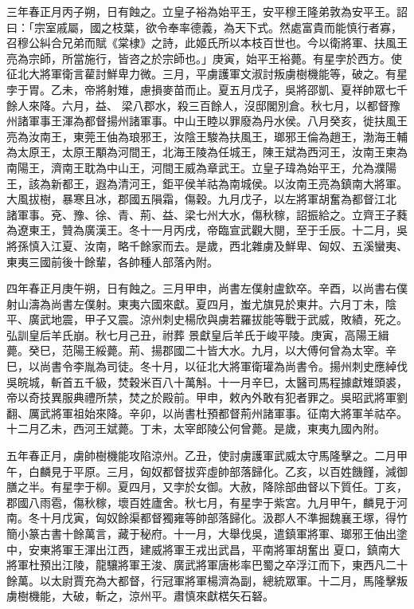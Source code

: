 \begin{pinyinscope}
 三年春正月丙子朔，日有蝕之。立皇子裕為始平王，安平穆王隆弟敦為安平王。詔曰：「宗室戚屬，國之枝葉，欲令奉率德義，為天下式。然處富貴而能慎行者寡，召穆公糾合兄弟而賦《棠棣》之詩，此姬氏所以本枝百世也。今以衛將軍、扶風王亮為宗師，所當施行，皆咨之於宗師也。」庚寅，始平王裕薨。有星孛於西方。使征北大將軍衛言雚討鮮卑力微。三月，平虜護軍文淑討叛虜樹機能等，破之。有星孛于胃。乙未，帝將射雉，慮損麥苗而止。夏五月戊子，吳將邵凱、夏祥帥眾七千餘人來降。六月，益、
 梁八郡水，殺三百餘人，沒邸閣別倉。秋七月，以都督豫州諸軍事王渾為都督揚州諸軍事。中山王睦以罪廢為丹水侯。八月癸亥，徙扶風王亮為汝南王，東莞王伷為琅邪王，汝陰王駿為扶風王，瑯邪王倫為趙王，渤海王輔為太原王，太原王顒為河間王，北海王陵為任城王，陳王斌為西河王，汝南王柬為南陽王，濟南王耽為中山王，河間王威為章武王。立皇子瑋為始平王，允為濮陽王，該為新都王，遐為清河王，鉅平侯羊祜為南城侯。以汝南王亮為鎮南大將軍。大風拔樹，暴寒且冰，郡國五隕霜，傷穀。九月戊子，以左將軍胡奮為都督江北
 諸軍事。兗、豫、徐、青、荊、益、梁七州大水，傷秋稼，詔振給之。立齊王子蕤為遼東王，贊為廣漢王。冬十一月丙戌，帝臨宣武觀大閱，至于壬辰。十二月，吳將孫慎入江夏、汝南，略千餘家而去。是歲，西北雜虜及鮮卑、匈奴、五溪蠻夷、東夷三國前後十餘輩，各帥種人部落內附。



 四年春正月庚午朔，日有蝕之。三月甲申，尚書左僕射盧欽卒。辛酉，以尚書右僕射山濤為尚書左僕射。東夷六國來獻。夏四月，蚩尤旗見於東井。六月丁未，陰平、廣武地震，甲子又震。涼州刺史楊欣與虜若羅拔能等戰于武威，敗績，死之。弘訓皇后羊氏崩。秋七月己丑，祔葬
 景獻皇后羊氏于峻平陵。庚寅，高陽王緝薨。癸巳，范陽王綏薨。荊、揚郡國二十皆大水。九月，以大傅何曾為太宰。辛巳，以尚書令李胤為司徒。冬十月，以征北大將軍衛瓘為尚書令。揚州刺史應綽伐吳皖城，斬首五千級，焚穀米百八十萬斛。十一月辛巳，太醫司馬程據獻雉頭裘，帝以奇技異服典禮所禁，焚之於殿前。甲申，敕內外敢有犯者罪之。吳昭武將軍劉翻、厲武將軍祖始來降。辛卯，以尚書杜預都督荊州諸軍事。征南大將軍羊祜卒。十二月乙未，西河王斌薨。丁未，太宰郎陵公何曾薨。是歲，東夷九國內附。



 五年春正月，虜帥樹機能攻陷涼州。乙丑，使討虜護軍武威太守馬隆擊之。二月甲午，白麟見于平原。三月，匈奴都督拔弈虛帥部落歸化。乙亥，以百姓饑饉，減御膳之半。有星孛于柳。夏四月，又孛於女御。大赦，降除部曲督以下質任。丁亥，郡國八雨雹，傷秋稼，壞百姓廬舍。秋七月，有星孛于紫宮。九月甲午，麟見于河南。冬十月戊寅，匈奴餘渠都督獨雍等帥部落歸化。汲郡人不準掘魏襄王塚，得竹簡小篆古書十餘萬言，藏于秘府。十一月，大舉伐吳，遣鎮軍將軍、瑯邪王伷出塗中，安東將軍王渾出江西，建威將軍王戎出武昌，平南將軍胡奮出
 夏口，鎮南大將軍杜預出江陵，龍驤將軍王浚、廣武將軍唐彬率巴蜀之卒浮江而下，東西凡二十餘萬。以太尉賈充為大都督，行冠軍將軍楊濟為副，總統眾軍。十二月，馬隆擊叛虜樹機能，大破，斬之，涼州平。肅慎來獻楛矢石砮。




\end{pinyinscope}
